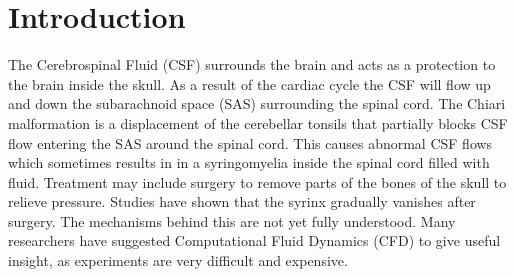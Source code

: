\section{Introduction}
The Cerebrospinal Fluid (CSF) surrounds the brain and acts as a protection to the brain inside the skull. As a result of the cardiac cycle the CSF will flow up and down the subarachnoid space (SAS) surrounding the spinal cord. The Chiari malformation is a displacement of the cerebellar tonsils that partially blocks CSF flow entering the SAS around the spinal cord. This causes abnormal CSF flows which sometimes results in in a syringomyelia inside the spinal cord filled with fluid. Treatment may include surgery to remove parts of the bones of the skull to relieve pressure. Studies have shown that the syrinx gradually vanishes after surgery. The mechanisms behind this are not yet fully understood. Many researchers have suggested Computational Fluid Dynamics (CFD) to give useful insight, as experiments are very difficult and expensive. 

